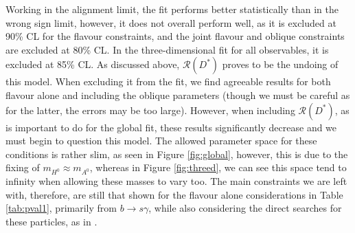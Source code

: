 \documentclass[a4paper,12pt]{article}
\begin{document}
Working in the alignment limit, the fit performs better statistically than in the wrong sign limit, however, it does not overall perform well, as it is excluded at 90\% CL for the flavour constraints, and the joint flavour and oblique constraints are excluded at 80\% CL. 
In the three-dimensional fit for all observables, it is excluded at 85\% CL.
As discussed above, $\mathcal{R}(D^*)$ proves to be the undoing of this model. 
When excluding it from the fit, we find agreeable results for both flavour alone and including the oblique parameters (though we must be careful as for the latter, the errors may be too large). 
However, when including $\mathcal{R}(D^*)$, as is important to do for the global fit, these results significantly decrease and we must begin to question this model. 
The allowed parameter space for these conditions is rather slim, as seen in Figure \ref{fig:global}, however, this is due to the fixing of $m_{H^0}\approx m_{A^0}$, whereas in Figure \ref{fig:threed}, we can see this space tend to infinity when allowing these masses to vary too. 
The main constraints we are left with, therefore, are still that shown for the flavour alone considerations in Table \ref{tab:pval1}, primarily from $b\to s\gamma$, while also considering the direct searches for these particles, as in \cite{h0search,dirhp}.
\end{document}

